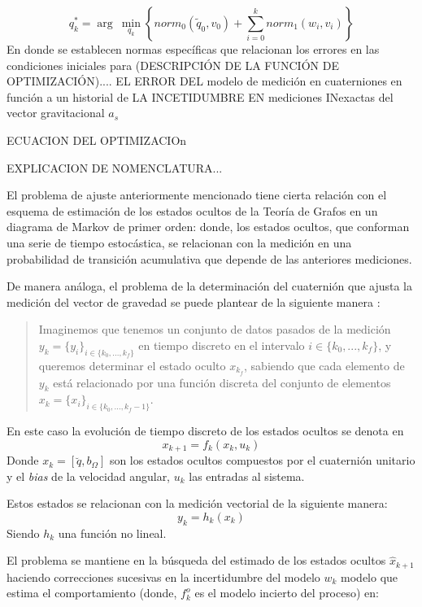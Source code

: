 \documentclass[conference]{IEEEtran}
\begin{document}
\begin{equation}
q^*_k=\arg~\min_{q_k}\left\{norm_0(\tilde{q}_0,v_0)+\sum^k_{i=0}norm_1(w_i,v_i)\right\}
\end{equation}
En donde se establecen normas específicas que relacionan los errores en las condiciones iniciales para 
(DESCRIPCIÓN DE LA FUNCIÓN DE OPTIMIZACIÓN).... EL ERROR DEL modelo de medición en cuaterniones en función a un historial de LA INCETIDUMBRE EN mediciones INexactas del vector gravitacional $a_s$ \par
ECUACION DEL OPTIMIZACIOn\par
EXPLICACION DE NOMENCLATURA...\par
El problema de ajuste anteriormente mencionado tiene cierta relación con el esquema de estimación de los estados ocultos de la Teoría de Grafos en un diagrama de Markov de primer orden: donde, los estados ocultos, que conforman una serie de tiempo estocástica, se relacionan con la medición en una probabilidad de transición acumulativa que depende de las anteriores mediciones.\par
De manera análoga, el problema de la determinación del cuaternión que ajusta la medición del vector de gravedad se puede plantear de la siguiente manera \cite{Merwe2004}: 
\begin{quote} Imaginemos que tenemos un conjunto de datos pasados de la medición $y_k=\{y_i\}_{i\in\{k_0,...,k_f\}}$ en tiempo discreto en el intervalo $i\in\{k_0,...,k_f\}$, y queremos determinar el estado oculto $x_{k_f}$, sabiendo que cada elemento de $y_k$ está relacionado por una función discreta del conjunto de elementos $x_k=\{x_i\}_{i\in\{k_0,...,k_f-1\}}$.\end{quote}
En este caso la evolución de tiempo discreto de los estados ocultos se denota en
\begin{equation}
\label{chap2:ecc1}
x_{k+1}=f_k(x_k,u_k)
\end{equation} 
Donde $x_k=[\breve{q},b_\Omega]$ son los estados ocultos compuestos por el cuaternión unitario y el \emph{bias} de la velocidad angular, $u_k$ las entradas al sistema. \par Estos estados se relacionan con la medición vectorial de la siguiente manera:
\begin{equation}
\label{chap2:ecc10}
y_{k}=h_k(x_k)
\end{equation} 
Siendo $h_k$ una función no lineal.\par El problema se mantiene en la búsqueda del estimado de los estados ocultos $\hat{x}_{k+1}$ haciendo correcciones sucesivas en la incertidumbre del modelo $w_k$ modelo que estima el comportamiento (donde, $f^o_k$ es el modelo incierto del proceso) en:
\end{document}
